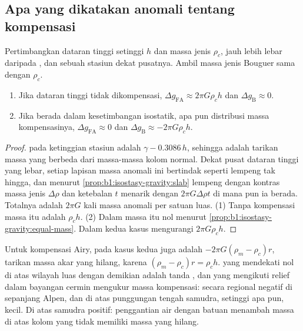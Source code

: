 \subsection*{Apa yang dikatakan anomali tentang kompensasi}

\begin{proposition}\label{prop:b1:isostasy-gravity:broad}
Pertimbangkan dataran tinggi setinggi $h$ dan massa jenis $\rho_c$, jauh lebih lebar daripada , dan sebuah stasiun dekat pusatnya. Ambil massa jenis Bouguer sama dengan $\rho_c$.
\begin{enumerate}
  \item Jika dataran tinggi tidak dikompensasi, $\Delta g_{\mathrm{FA}} \approx
        2\pi G\rho_c h$ dan $\Delta g_{\mathrm B} \approx 0$.
  \item Jika berada dalam kesetimbangan isostatik, apa pun distribusi massa kompensasinya, $\Delta g_{\mathrm{FA}} \approx 0$ dan
        $\Delta g_{\mathrm B} \approx -2\pi G\rho_c h$.
\end{enumerate}
\end{proposition}

\begin{proof}
 pada ketinggian stasiun adalah $\gamma - 0.3086\,h$, sehingga  adalah tarikan massa yang berbeda dari massa-massa kolom normal.
Dekat pusat dataran tinggi yang lebar, setiap lapisan massa anomali ini bertindak seperti lempeng tak hingga, dan menurut \cref{prop:b1:isostasy-gravity:slab} lempeng dengan kontras massa jenis $\Delta\rho$ dan ketebalan $t$ menarik dengan $2\pi G\Delta\rho
t$ di mana pun ia berada. Totalnya adalah $2\pi G$ kali massa anomali per satuan luas. (1) Tanpa kompensasi massa itu adalah $\rho_c h$. (2) Dalam  massa itu nol menurut
\cref{prop:b1:isostasy-gravity:equal-mass}. Dalam kedua kasus  mengurangi $2\pi G\rho_c h$.
\end{proof}

Untuk kompensasi Airy,  pada kasus kedua juga adalah
$-2\pi G(\rho_m - \rho_c)r$, tarikan massa akar yang hilang,
karena $(\rho_m - \rho_c)r = \rho_c h$.  yang mendekati nol di atas wilayah luas dengan demikian adalah tanda , dan  yang mengikuti relief dalam bayangan cermin mengukur massa kompensasi:  secara regional negatif di sepanjang Alpen, dan di atas punggungan tengah samudra, setinggi apa pun,  kecil. Di atas samudra  positif: penggantian air dengan batuan menambah massa di atas kolom yang tidak memiliki massa yang hilang.

